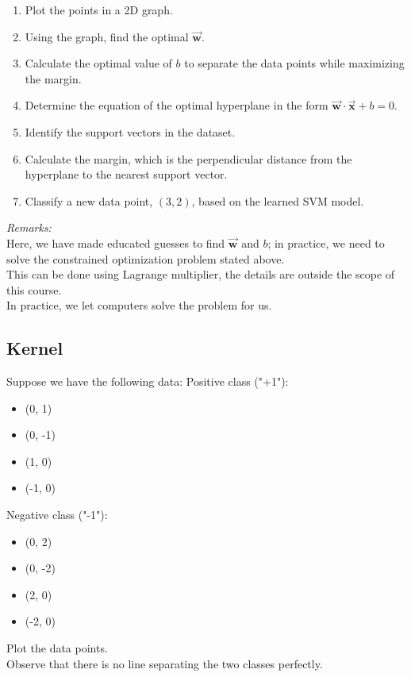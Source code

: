 \documentclass[]{article}
\newcommand{\vecx}{ \vec{\mathbf{x}} }
\newcommand{\vecw}{ \vec{\mathbf{w}} }
\begin{document}
	\begin{enumerate}
		\item Plot the points in a 2D graph.
		\item Using the graph, find the optimal $\vecw$.
		\item Calculate the optimal value of \(b\) to separate the data points while maximizing the margin.
		\item Determine the equation of the optimal hyperplane in the form \(\vecw \cdot \vecx + b = 0\).
		\item Identify the support vectors in the dataset.
		\item Calculate the margin, which is the perpendicular distance from the hyperplane to the nearest support vector.
		\item Classify a new data point, \((3, 2)\), based on the learned SVM model.
	\end{enumerate}
	\textit{Remarks:}\\
	Here, we have made educated guesses to find $\vecw$ and $b$; in practice, we need to solve the constrained optimization problem stated above.\\
	This can be done using Lagrange multiplier, the details are outside the scope of this course.\\
	In practice, we let computers solve the problem for us.
	
	
	
	\subsection{Kernel}
	Suppose we have the following data:
	Positive class ("+1"):
	\begin{itemize}
		\item (0, 1)
		\item (0, -1)
		\item (1, 0)
		\item (-1, 0)
	\end{itemize}
	Negative class ("-1"):
	\begin{itemize}
		\item (0, 2)
		\item (0, -2)
		\item (2, 0)
		\item (-2, 0)
	\end{itemize}
	Plot the data points.\\
	Observe that there is no line separating the two classes perfectly.
	
	\vspace{0.5cm}
	
\end{document}
